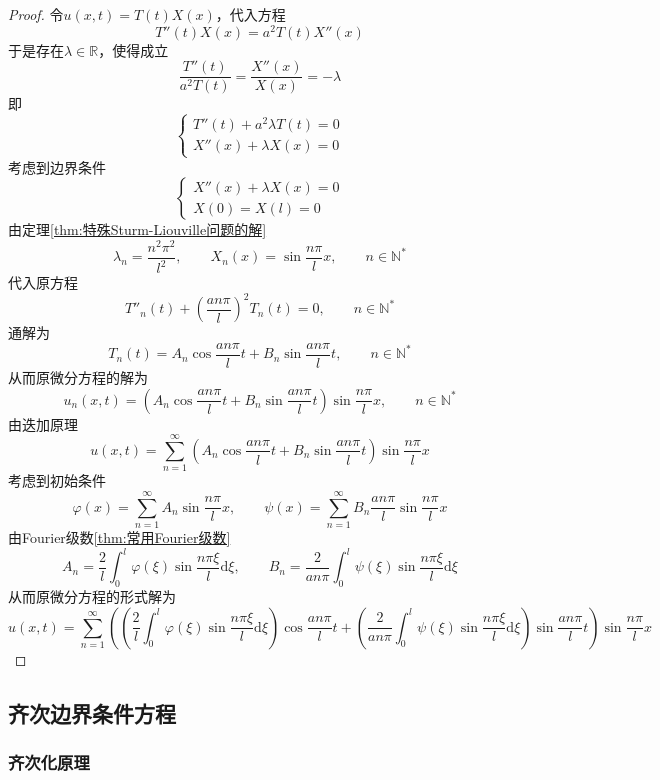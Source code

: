 \documentclass[lang = cn, scheme = chinese, thmcnt = section]{elegantbook}
\newcommand{\N}{\mathbb{N}}            %
\newcommand{\R}{\mathbb{R}}            %
\newcommand{\dd}{\mathrm{d}}           %
\begin{document}
\begin{proof}
	令$u(x,t)=T(t)X(x)$，代入方程
	$$
	T''(t)X(x)=a^2T(t)X''(x)
	$$
	于是存在$\lambda\in\R$，使得成立
	$$
	\frac{T''(t)}{a^2T(t)}
	=\frac{X''(x)}{X(x)}
	=-\lambda
	$$
	即%
	$$
	\begin{cases}
		T''(t)+a^2\lambda T(t)=0\\
		X''(x)+\lambda X(x)=0
	\end{cases}
	$$
	考虑到边界条件
	$$
	\begin{cases}
		X''(x)+\lambda X(x)=0\\
		X(0)=X(l)=0
	\end{cases}
	$$
	由定理\ref{thm:特殊Sturm-Liouville问题的解}%
	$$
	\lambda_n=\frac{n^2\pi^2}{l^2},\qquad 
	X_n(x)=\sin\frac{n\pi}{l}x,\qquad n\in\N^*
	$$
	代入原方程
	$$
	T''_n(t)+\left(\frac{an\pi}{l}\right)^2T_n(t)=0,\qquad n\in\N^*
	$$
	通解为
	$$
	T_n(t)=A_n\cos\frac{an\pi}{l}t+B_n\sin \frac{an\pi}{l}t,\qquad 
	n\in\N^*
	$$
	从而原微分方程的解为
	$$
	u_n(x,t)
	=\left(A_n\cos\frac{an\pi}{l}t+B_n\sin \frac{an\pi}{l}t\right)\sin\frac{n\pi}{l}x,\qquad 
	n\in\N^*
	$$
	由迭加原理
	$$
	u(x,t)=\sum_{n=1}^{\infty}\left(A_n\cos\frac{an\pi}{l}t+B_n\sin \frac{an\pi}{l}t\right)\sin\frac{n\pi}{l}x
	$$
	考虑到初始条件
	$$
	\varphi(x)=\sum_{n=1}^{\infty}A_n\sin\frac{n\pi}{l}x,\qquad 
	\psi(x)=\sum_{n=1}^{\infty}B_n\frac{an\pi}{l}\sin\frac{n\pi}{l}x
	$$
	由Fourier级数\ref{thm:常用Fourier级数}
	$$
	A_n=\frac{2}{l}\int_0^l\varphi(\xi)\sin\frac{n\pi \xi}{l}\dd \xi,\qquad 
	B_n=\frac{2}{an\pi}\int_0^l\psi(\xi)\sin\frac{n\pi \xi}{l}\dd \xi
	$$
	从而原微分方程的形式解为
	$$
	u(x,t)=\sum_{n=1}^{\infty}\left(\left(\frac{2}{l}\int_0^l\varphi(\xi)\sin\frac{n\pi \xi}{l}\dd \xi\right)\cos\frac{an\pi}{l}t+\left(\frac{2}{an\pi}\int_0^l\psi(\xi)\sin\frac{n\pi \xi}{l}\dd \xi\right)\sin \frac{an\pi}{l}t\right)\sin\frac{n\pi}{l}x
	$$
\end{proof}

\subsection{齐次边界条件方程}

\subsubsection{齐次化原理}
\end{document}
